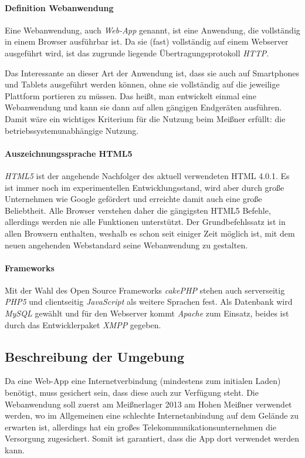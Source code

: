 \paragraph{Definition Webanwendung} 
Eine Webanwendung, auch \emph{Web-App} genannt, ist eine Anwendung, die vollständig in einem Browser ausführbar ist. Da sie (fast) vollständig auf einem Webserver ausgeführt wird, ist das zugrunde liegende Übertragungsprotokoll \emph{HTTP}.\par

Das Interessante an dieser Art der Anwendung ist, dass sie auch auf Smartphones und Tablets ausgeführt werden können, ohne sie vollständig auf die jeweilige Plattform portieren zu müssen. Das heißt, man entwickelt einmal eine Webanwendung und kann sie dann auf allen gängigen Endgeräten ausführen.\\
Damit wäre ein wichtiges Kriterium für die Nutzung beim Meißner erfüllt: die betriebssystemunabhängige Nutzung.

\paragraph{Auszeichnungssprache HTML5}
\emph{HTML5} ist der angehende Nachfolger des aktuell verwendeten HTML 4.0.1. Es ist immer noch im experimentellen Entwicklungsstand, wird aber durch große Unternehmen wie Google gefördert und erreichte damit auch eine große Beliebtheit. Alle Browser verstehen daher die gängigsten HTML5 Befehle, allerdings werden nie alle Funktionen unterstützt. Der Grundbefehlssatz ist in allen Browsern enthalten, weshalb es schon seit einiger Zeit möglich ist, mit dem neuen angehenden Webstandard seine Webanwendung zu gestalten.

\paragraph{Frameworks}
Mit der Wahl des Open Source Frameworks \emph{cakePHP} \cite{cakePHP} stehen auch serverseitig \emph{PHP5} und clientseitig \emph{JavaScript} als weitere Sprachen fest. Als Datenbank wird \emph{MySQL} gewählt und für den Webserver kommt \emph{Apache} zum Einsatz, beides ist durch das Entwicklerpaket \emph{XMPP} gegeben.

\subsection{Beschreibung der Umgebung}
Da eine Web-App eine Internetverbindung (mindestens zum initialen Laden) benötigt, muss gesichert sein, dass diese auch zur Verfügung steht. Die Webanwendung soll zuerst am Meißnerlager 2013 am Hohen Meißner verwendet werden, wo im Allgemeinen eine schlechte Internetanbindung auf dem Gelände zu erwarten ist, allerdings hat ein großes Telekommunikationsunternehmen die Versorgung zugesichert. Somit ist garantiert, dass die App dort verwendet werden kann.

